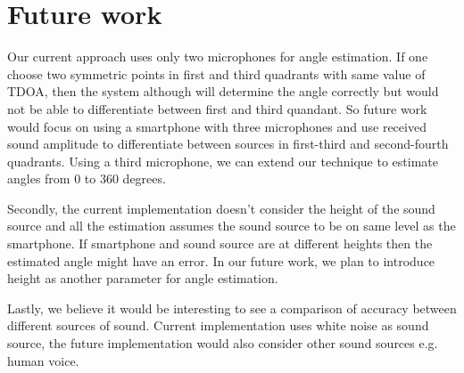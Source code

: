 \section{Future work}
Our current approach uses only two microphones for angle estimation. If one choose two symmetric points in first and third quadrants with same value of TDOA, then the system although will determine the angle correctly but would not be able to differentiate between first and third quandant. So future work would focus on using a smartphone with three microphones and use received sound amplitude to differentiate between sources in first-third and second-fourth quadrants. Using a third microphone, we can extend our technique to estimate angles from 0 to 360 degrees.

Secondly, the current implementation doesn't consider the height of the sound source and all the estimation assumes the sound source to be on same level as the smartphone. If smartphone and sound source are at different heights then the estimated angle might have an error. In our future work, we plan to introduce height as another parameter for angle estimation. 

Lastly, we believe it would be interesting to see a comparison of accuracy between different sources of sound. Current implementation uses white noise as sound source, the future implementation would also consider other sound sources e.g. human voice.

